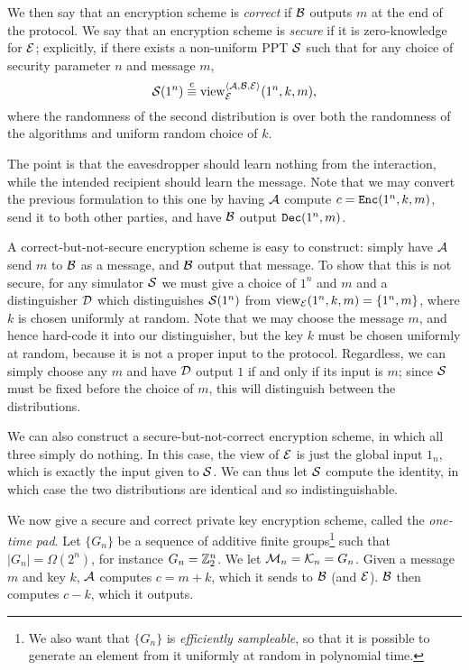 We then say that an encryption scheme is \emph{correct} if $\mathcal{B}$ outputs $m$ at
the end of the protocol. We say that an encryption scheme is \emph{secure} if it
is zero-knowledge for $\mathcal{E}$; explicitly, if there exists a non-uniform PPT $\mathcal{S}$
such that for any choice of security parameter $n$ and message $m$, \[
  \mathcal{S}(1^n) \overset{\text{c}}{\equiv} \operatorname{view}_{\mathcal{E}}^{\langle\mathcal{A}, \mathcal{B}, \mathcal{E}\rangle}(1^n, k, m),
\]where the randomness of the second distribution is over both the randomness of
the algorithms and uniform random choice of $k$.

The point is that the eavesdropper should learn nothing from the interaction,
while the intended recipient should learn the message. Note that we may convert
the previous formulation to this one by having $\mathcal{A}$ compute $c = {\texttt{Enc}}(1^n,
k, m)$, send it to both other parties, and have $\mathcal{B}$ output ${\texttt{Dec}}(1^n,
m)$.

A correct-but-not-secure encryption scheme is easy to construct: simply have
$\mathcal{A}$ send $m$ to $\mathcal{B}$ as a message, and $\mathcal{B}$ output that message. To show
that this is not secure, for any simulator $\mathcal{S}$ we must give a choice of $1^n$
and $m$ and a distinguisher $\mathcal{D}$ which distinguishes $\mathcal{S}(1^n)$ from
$\operatorname{view}_{\mathcal{E}}(1^n, k, m) = \{1^n, m\}$, where $k$ is chosen uniformly at random.
Note that we may choose the message $m$, and hence hard-code it into our
distinguisher, but the key $k$ must be chosen uniformly at random, because it is
not a proper input to the protocol. Regardless, we can simply choose any $m$ and
have $\mathcal{D}$ output $1$ if and only if its input is $m$; since $\mathcal{S}$ must be fixed
before the choice of $m$, this will distinguish between the distributions.

We can also construct a secure-but-not-correct encryption scheme, in which all
three simply do nothing. In this case, the view of $\mathcal{E}$ is just the global
input $1_n$, which is exactly the input given to $\mathcal{S}$. We can thus let $\mathcal{S}$
compute the identity, in which case the two distributions are identical and so
indistinguishable.

We now give a secure and correct private key encryption scheme, called the
\emph{one-time pad}. Let $\{G_n\}$ be a sequence of additive finite groups\footnote{
  We also want that $\{G_n\}$ is \emph{efficiently sampleable}, so that it is
  possible to generate an element from it uniformly at random in polynomial
  time.
} such that $|G_n| = \Omega(2^n)$, for instance $G_n = \mathbb{Z}_2^n$. We let $\mathcal{M}_n =
\mathcal{K}_n = G_n$. Given a message $m$ and key $k$, $\mathcal{A}$ computes $c = m + k$, which
it sends to $\mathcal{B}$ (and $\mathcal{E}$). $\mathcal{B}$ then computes $c - k$, which it outputs.

